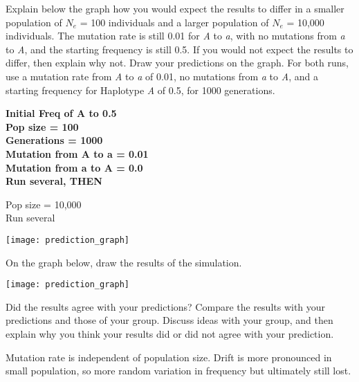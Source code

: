 \documentclass[11pt, addpoints]{exam}
\begin{document}
\begin{questions}
\question[1]
Explain below the graph how you would expect the results to
differ in a smaller population of $N_e$ = 100
individuals and a larger population of $N_e$ =
10,000 individuals. The mutation rate is still 0.01 for \textit{A} to
\textit{a}, with no mutations from \textit{a} to \textit{A}, and the starting frequency is still
0.5. If you would not expect the results to differ, then
explain why not. Draw your predictions on the graph. 
For both runs, use a mutation rate from \emph{A} to \emph{a} of 0.01, no mutations from
\emph{a} to \emph{A}, and a starting frequency for Haplotype \emph{A} of
0.5, for 1000 generations.

\ifprintanswers
	{\bfseries 
	Initial Freq of A to 0.5\\
	Pop size = 100\\
	Generations = 1000\\
	Mutation from A to a = 0.01\\
	Mutation from a to A = 0.0\\
	Run several, THEN\vspace{\baselineskip}
	
	Pop size = 10,000\\
	Run several}\vspace{11\baselineskip}
\else
	\begin{center}
		\texttt{[image: prediction\_graph]}
	\end{center}
\fi

\newpage

\question
On the graph below, draw the results of the simulation.

\begin{center}
	\texttt{[image: prediction\_graph]}
\end{center}

\question
Did the results agree with your predictions? Compare the
results with your predictions and those of your group. Discuss ideas
with your group, and then explain why you think your results did or did
not agree with your prediction.

\begin{solution}
Mutation rate is independent of population size. Drift is more pronounced in small population, so more random variation in frequency but ultimately still lost.
\end{solution}

\newpage


\end{questions}
\end{document}
